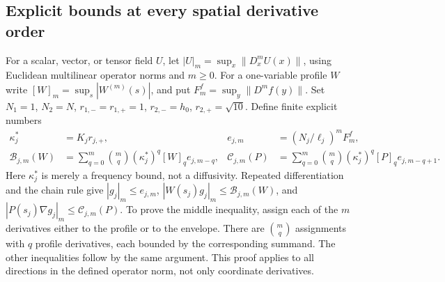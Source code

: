 \subsection{Explicit bounds at every spatial derivative order}

For a scalar, vector, or tensor field $U$, let
$|U|_m=\sup_x\|D_x^mU(x)\|$, using Euclidean multilinear
operator norms and $m\geq0$. For a one-variable profile $W$ write
$[W]_m=\sup_s|W^{(m)}(s)|$, and put $F_m^f=\sup_y\|D^mf(y)\|$.
Set $N_1=1$, $N_2=N$, $r_{1,-}=r_{1,+}=1$,
$r_{2,-}=h_0$, $r_{2,+}=\sqrt{10}$. Define finite explicit
numbers
\begin{align}
 \kappa_j^*&=K_jr_{j,+},&
 e_{j,m}&=(N_j/\ell_j)^m F_m^f,\nonumber\\
 \mathcal B_{j,m}(W)&=\sum_{q=0}^m\binom mq
       (\kappa_j^*)^q[W]_q e_{j,m-q},&
 \mathcal C_{j,m}(P)&=\sum_{q=0}^m\binom mq
       (\kappa_j^*)^q[P]_q e_{j,m-q+1}.
 \label{ms:Bnorm}
\end{align}
Here $\kappa_j^*$ is merely a frequency bound, not a diffusivity.
Repeated differentiation and the chain rule give
$|g_j|_m\leq e_{j,m}$,
$|W(s_j)g_j|_m\leq\mathcal B_{j,m}(W)$, and
$|P(s_j)\nabla g_j|_m\leq\mathcal C_{j,m}(P)$.
To prove the middle inequality, assign each of the $m$ derivatives
either to the profile or to the envelope. There are $\binom mq$
assignments with $q$ profile derivatives, each bounded by the
corresponding summand. The other inequalities follow by the same
argument. This proof applies to all directions in the defined
operator norm, not only coordinate derivatives.

